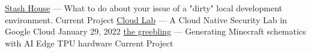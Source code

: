 \vspace*{5pt}
\href{https://zenodo.org/records/19122412}{Stash House} --- What to do about your issue of a "dirty" local development environment.  \hfill Current Project
\vspace*{5pt}
\newline
\href{https://zenodo.org/records/5918861}{Cloud Lab} --- A Cloud Native Security Lab in Google Cloud   \hfill January 29, 2022
\vspace*{5pt}
\newline
\href{https://github.com/pale-shadow/game-skynet-minecraft}{the greebling} --- Generating Minecraft schematics with AI Edge TPU hardware  \hfill Current Project
\vspace*{5pt}